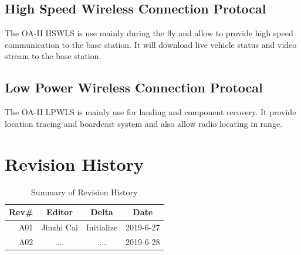 \documentclass[12pt,article]{memoir}
\begin{document}
\section{High Speed Wireless Connection Protocal}
The OA-II HSWLS is use mainly during the fly and allow to provide high speed communication to the base station. It will download live vehicle status and video stream to the base station.
\section{Low Power Wireless Connection Protocal}
The OA-II LPWLS is mainly use for landing and component recovery. It provide location tracing and boardcast system and also allow radio locating in range.

\chapter{Revision History}
\begin{table}[H]
	\centering
	\begin{tabu}{r || c | c | c }
		Rev\# & Editor & Delta & Date\\ \hline
		A01 & Jinzhi Cai & Initialize  & 2019-6-27\\ \hline
		A02 & .... & ....  & 2019-6-28
	\end{tabu}
	\caption{Summary of Revision History}
	\label{tab:edatools}
\end{table}
\end{document}
